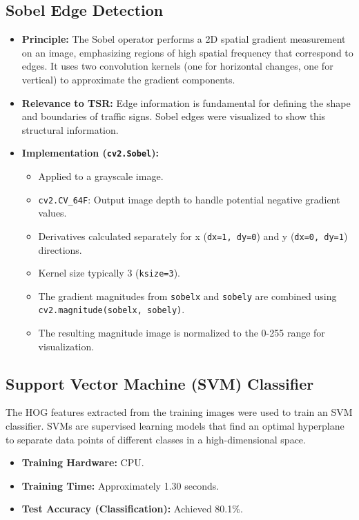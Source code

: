 \documentclass[11pt, a4paper]{article}
\begin{document}
\subsection{Sobel Edge Detection}
\begin{itemize}
    \item \textbf{Principle:} The Sobel operator performs a 2D spatial gradient measurement on an image, emphasizing regions of high spatial frequency that correspond to edges. It uses two convolution kernels (one for horizontal changes, one for vertical) to approximate the gradient components.
    \item \textbf{Relevance to TSR:} Edge information is fundamental for defining the shape and boundaries of traffic signs. Sobel edges were visualized to show this structural information.
    \item \textbf{Implementation (\texttt{cv2.Sobel}):}
        \begin{itemize}
            \item Applied to a grayscale image.
            \item \texttt{cv2.CV\_64F}: Output image depth to handle potential negative gradient values.
            \item Derivatives calculated separately for x (\texttt{dx=1, dy=0}) and y (\texttt{dx=0, dy=1}) directions.
            \item Kernel size typically 3 (\texttt{ksize=3}).
            \item The gradient magnitudes from \texttt{sobelx} and \texttt{sobely} are combined using \texttt{cv2.magnitude(sobelx, sobely)}.
            \item The resulting magnitude image is normalized to the 0-255 range for visualization.
        \end{itemize}
\end{itemize}

\subsection{Support Vector Machine (SVM) Classifier}
The HOG features extracted from the training images were used to train an SVM classifier. SVMs are supervised learning models that find an optimal hyperplane to separate data points of different classes in a high-dimensional space.
\begin{itemize}
    \item \textbf{Training Hardware:} CPU.
    \item \textbf{Training Time:} Approximately 1.30 seconds.
    \item \textbf{Test Accuracy (Classification):} Achieved 80.1\%.
\end{itemize}
\end{document}
